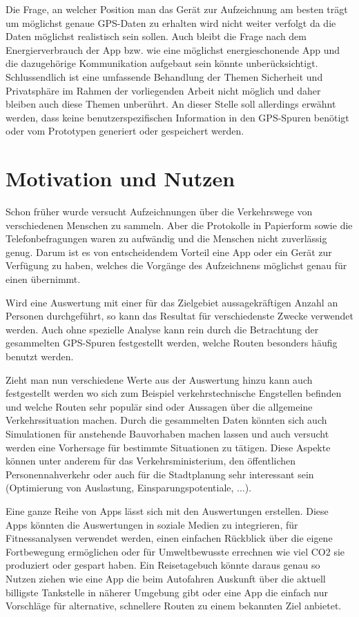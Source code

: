 Die Frage, an welcher Position man das Gerät zur Aufzeichnung am besten trägt um möglichst genaue GPS-Daten zu erhalten wird nicht weiter verfolgt da die Daten möglichst realistisch sein sollen. Auch bleibt die Frage nach dem Energierverbrauch der App bzw. wie eine möglichst energieschonende App und die dazugehörige Kommunikation aufgebaut sein könnte unberücksichtigt. Schlussendlich ist eine umfassende Behandlung der Themen Sicherheit und Privatsphäre im Rahmen der vorliegenden Arbeit nicht möglich und daher bleiben auch diese Themen unberührt. An dieser Stelle soll allerdings erwähnt werden, dass keine benutzerspezifischen Information in den GPS-Spuren benötigt oder vom Prototypen generiert oder gespeichert werden.

\section{Motivation und Nutzen}
Schon früher wurde versucht Aufzeichnungen über die Verkehrswege von verschiedenen Menschen zu sammeln. Aber die Protokolle in Papierform sowie die Telefonbefragungen waren zu aufwändig und die Menschen nicht zuverlässig genug. Darum ist es von entscheidendem Vorteil eine App oder ein Gerät zur Verfügung zu haben, welches die Vorgänge des Aufzeichnens möglichst genau für einen übernimmt. \cite{zheng_understanding_2010}

Wird eine Auswertung mit einer für das Zielgebiet aussagekräftigen Anzahl an Personen durchgeführt, so kann das Resultat  für verschiedenste Zwecke verwendet werden. Auch ohne spezielle Analyse kann rein durch die Betrachtung der gesammelten GPS-Spuren festgestellt werden, welche Routen besonders häufig benutzt werden.

Zieht man nun verschiedene Werte aus der Auswertung hinzu kann auch festgestellt werden wo sich zum Beispiel verkehrstechnische Engstellen befinden und welche Routen sehr populär sind oder Aussagen über die allgemeine Verkehrssituation machen. Durch die gesammelten Daten könnten sich auch Simulationen für anstehende Bauvorhaben machen lassen und auch versucht werden eine Vorhersage für bestimmte Situationen zu tätigen. Diese Aspekte können unter anderem für das Verkehrsministerium,  den öffentlichen Personennahverkehr oder auch für die Stadtplanung sehr interessant sein (Optimierung von Auslastung, Einsparungspotentiale, ...).

Eine ganze Reihe von Apps lässt sich mit den Auswertungen erstellen. Diese Apps könnten die Auswertungen in soziale Medien zu integrieren, für Fitnessanalysen verwendet werden, einen einfachen Rückblick über die eigene Fortbewegung ermöglichen oder für Umweltbewusste errechnen wie viel CO2 sie produziert oder gespart haben. Ein Reisetagebuch könnte daraus genau so Nutzen ziehen wie eine App die beim Autofahren Auskunft über die aktuell billigste Tankstelle in näherer Umgebung gibt oder eine App die einfach nur Vorschläge für alternative, schnellere Routen zu einem bekannten Ziel anbietet.

